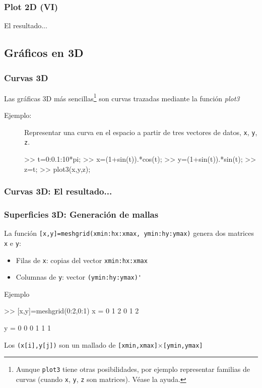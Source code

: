 
\begin{frame}\frametitle{Plot 2D (VI)}
  El resultado...
\begin{center}
\end{center}
\end{frame}

\subsection{Gráficos en 3D}


\begin{frame}[containsverbatim]
  \frametitle{Curvas 3D}
  Las gráficas 3D más sencillas\footnote{Aunque
  \texttt{plot3} tiene otras posibilidades, por ejemplo representar
  familias de curvas (cuando \texttt{x}, \texttt{y}, \texttt{z} son
  matrices). Véase la ayuda.} son curvas trazadas mediante la función
  \emph{plot3}
  \begin{description}
  \item [Ejemplo:] Representar una curva en el espacio a partir de tres
    vectores de datos, \verb|x|, \verb|y|, \verb|z|.
\begin{Octave}
  >> t=0:0.1:10*pi;
  >> x=(1+sin(t)).*cos(t);
  >> y=(1+sin(t)).*sin(t);
  >> z=t;
  >> plot3(x,y,z);
\end{Octave}
\end{description}
\end{frame}

\begin{frame}\frametitle{Curvas 3D: El resultado...}
\begin{center}
\end{center}
\end{frame}

\begin{frame}[containsverbatim]
  \frametitle{Superficies 3D: Generación de mallas}
  La función \verb|[x,y]=meshgrid(xmin:hx:xmax, ymin:hy:ymax)| genera
  dos matrices \verb|x| e \verb|y|:
  \begin{itemize}
  \item Filas de \verb|x|: copias del vector \verb|xmin:hx:xmax|
  \item Columnas de \verb|y|: vector \verb|(ymin:hy:ymax)'|
  \end{itemize}
  Ejemplo
\begin{Octave}
  >> [x,y]=meshgrid(0:2,0:1)
  x =
   0   1   2
   0   1   2

 y =
   0   0   0
   1   1   1
\end{Octave}
Los \verb|(x[i],y[j])| son un mallado de \verb|[xmin,xmax]|$\times$\verb|[ymin,ymax]|
\end{frame}


